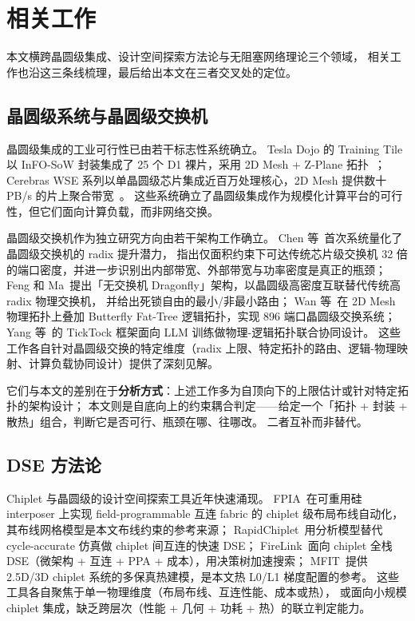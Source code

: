 \chapter{相关工作}\label{chap:related-work}

本文横跨晶圆级集成、设计空间探索方法论与无阻塞网络理论三个领域，
相关工作也沿这三条线梳理，最后给出本文在三者交叉处的定位。

\section{晶圆级系统与晶圆级交换机}\label{sec:rw-wafer}

晶圆级集成的工业可行性已由若干标志性系统确立。
Tesla Dojo 的 Training Tile 以 InFO-SoW 封装集成了 25 个 D1 裸片，采用 2D Mesh + Z-Plane 拓扑~\cite{tesla2022dojo}；
Cerebras WSE 系列以单晶圆级芯片集成近百万处理核心，2D Mesh 提供数十 PB/s 的片上聚合带宽~\cite{cerebras2022wse2}。
这些系统确立了晶圆级集成作为规模化计算平台的可行性，但它们面向计算负载，而非网络交换。

晶圆级交换机作为独立研究方向由若干架构工作确立。
Chen 等~\cite{chen2024waferscale}首次系统量化了晶圆级交换机的 radix 提升潜力，
指出仅面积约束下可达传统芯片级交换机 32 倍的端口密度，并进一步识别出内部带宽、外部带宽与功率密度是真正的瓶颈；
Feng 和 Ma~\cite{feng2024switchless}提出「无交换机 Dragonfly」架构，以晶圆级高密度互联替代传统高 radix 物理交换机，
并给出死锁自由的最小/非最小路由；
Wan 等~\cite{wan2024architectural}在 2D Mesh 物理拓扑上叠加 Butterfly Fat-Tree 逻辑拓扑，实现 896 端口晶圆级交换系统；
Yang 等~\cite{yang2025pd}的 TickTock 框架面向 LLM 训练做物理-逻辑拓扑联合协同设计。
这些工作各自针对晶圆级交换的特定维度（radix 上限、特定拓扑的路由、逻辑-物理映射、计算负载协同设计）提供了深刻见解。

它们与本文的差别在于\textbf{分析方式}：上述工作多为自顶向下的上限估计或针对特定拓扑的架构设计；
本文则是自底向上的约束耦合判定——给定一个「拓扑 + 封装 + 散热」组合，判断它是否可行、瓶颈在哪、往哪改。
二者互补而非替代。

\section{DSE 方法论}\label{sec:rw-dse}

Chiplet 与晶圆级的设计空间探索工具近年快速涌现。
FPIA~\cite{jiao2024fpia}在可重用硅 interposer 上实现 field-programmable 互连 fabric 的 chiplet 级布局布线自动化，
其布线网格模型是本文布线约束的参考来源；
RapidChiplet~\cite{iff2025rapidchiplet}用分析模型替代 cycle-accurate 仿真做 chiplet 间互连的快速 DSE；
FireLink~\cite{li2025firelink}面向 chiplet 全栈 DSE（微架构 + 互连 + PPA + 成本），用决策树加速搜索；
MFIT~\cite{mfit2025}提供 2.5D/3D chiplet 系统的多保真热建模，是本文热 L0/L1 梯度配置的参考。
这些工具各自聚焦于单一物理维度（布局布线、互连性能、成本或热），
或面向小规模 chiplet 集成，缺乏跨层次（性能 + 几何 + 功耗 + 热）的联立判定能力。

